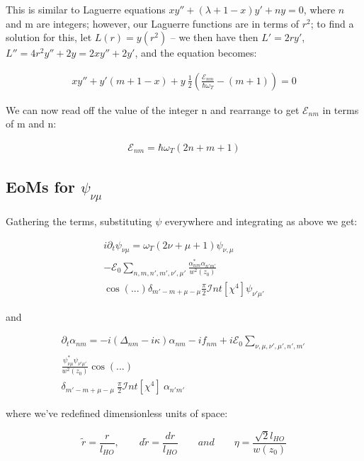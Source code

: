 \documentclass[a4paper,twocolumn,nobalancelastpage]{revtex4-1}
\newcommand{\lho}{l_{HO}}
\newcommand{\wz}{w(z_0)}
\newcommand{\wzsq}{w^2(z_0)}
\newcommand{\af}{\psi_{\nu\mu}}
\newcommand{\lf}{\alpha_{nm}}
\newcommand{\lfp}{\alpha_{n'm'}}
\newcommand{\intfour}{\mathcal{I}nt[\chi^4]}
\begin{document}
This is similar to Laguerre equations $xy''+(\lambda+1-x)y'+n y=0$, where $n$ and m are integers; however, our Laguerre functions are in terms of $r^2$; to find a solution for this, let $L(r)=y(r^2)$ -- we then have then $L'=2ry'$,$L''=4r^2y''+2y=2xy''+2y'$, and the equation becomes:

\begin{align}
xy''+y'(m+1-x)+ y \ \frac{1}{2}\left(\frac{\mathcal{E}_{nm}}{\hbar \omega_{T}} -(m+1)\right)=0 
\end{align}

We can now read off the value of the integer n and rearrange to get $\mathcal{E}_{nm}$ in terms of m and n:

\begin{align}
\label{eq:laguerreterm}
\mathcal{E}_{nm}=\hbar \omega_T (2n+m+1)
\end{align}

\subsection{EoMs for $\af$}

Gathering the terms, substituting $\psi$ everywhere and integrating as above we get:

\begin{multline}
i \partial_t \psi_{\nu \mu} = \omega_T (2\nu+\mu+1) \psi_{\nu, \mu}
\\ -  \mathcal{E}_0 \sum_{n,m,n',m', \nu', \mu'} \frac{\lf^* \lfp}{\wzsq}  \\ \cos(...) \delta_{m'-m+\mu-\mu} 
\frac{\pi}{2}
\intfour \psi_{\nu' \mu'}
\end{multline}

and

\begin{multline}
\partial_t \alpha_{nm}= -i(\Delta_{nm}-i\kappa) \alpha_{nm}-if_{nm} +i\mathcal{E}_0 \sum_{\nu, \mu,\nu', \mu',n',m'} \\ \frac{ \psi_{\nu\mu}^* \psi_{\nu'\mu'}}{ w^2(z_0)} \cos (...) \\ \delta_{m'-m+\mu-\mu} \ 
\frac{\pi}{2} \intfour \ \alpha_{n'm'} 
\end{multline}

where we've redefined dimensionless units of space:

\begin{equation}
\tilde{r}=\frac{r}{l_{HO}}, \qquad d\tilde{r}=\frac{dr}{l_{HO}} \qquad and \qquad \eta=\frac{\sqrt{2}\lho}{\wz} 
\end{equation}
\end{document}
